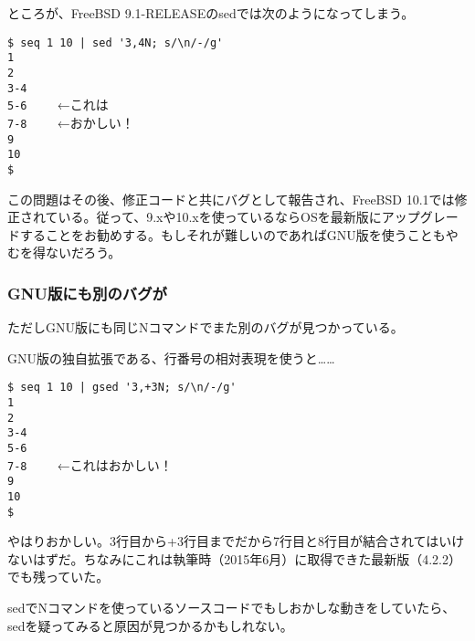ところが、FreeBSD 9.1-RELEASEのsedでは次のようになってしまう。

\begin{screen}
	\verb!$ seq 1 10 | sed '3,4N; s/\n/-/g'! \return \\
	\verb!1! \\
	\verb!2! \\
	\verb!3-4! \\
	\verb!5-6    ! ←これは \\
	\verb!7-8    ! ←おかしい！ \\
	\verb!9! \\
	\verb!10! \\
	\verb!$ !
\end{screen}

この問題はその後、修正コードと共にバグとして報告され、FreeBSD 10.1では修正されている。従って、9.xや10.xを使っているならOSを最新版にアップグレードすることをお勧めする。もしそれが難しいのであればGNU版を使うこともやむを得ないだろう。

\subsubsection*{GNU版にも別のバグが}

ただしGNU版にも同じNコマンドでまた別のバグが見つかっている。

GNU版の独自拡張である、行番号の相対表現を使うと……

\begin{screen}
	\verb!$ seq 1 10 | gsed '3,+3N; s/\n/-/g'! \return \\
	\verb!1! \\
	\verb!2! \\
	\verb!3-4! \\
	\verb!5-6! \\
	\verb!7-8    ! ←これはおかしい！ \\
	\verb!9! \\
	\verb!10! \\
	\verb!$ !
\end{screen}

\noindent
やはりおかしい。3行目から+3行目までだから7行目と8行目が結合されてはいけないはずだ。ちなみにこれは執筆時（2015年6月）に取得できた最新版（4.2.2）でも残っていた。

sedでNコマンドを使っているソースコードでもしおかしな動きをしていたら、sedを疑ってみると原因が見つかるかもしれない。
